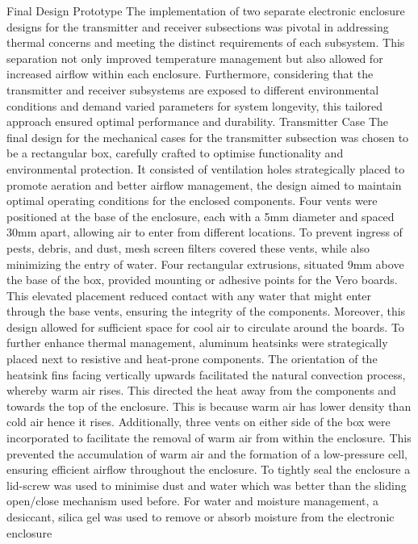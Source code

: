 Final Design Prototype
The implementation of two separate electronic enclosure designs for the transmitter and receiver subsections was pivotal in addressing thermal concerns and meeting the distinct requirements of each subsystem. This separation not only improved temperature management but also allowed for increased airflow within each enclosure. Furthermore, considering that the transmitter and receiver subsystems are exposed to different environmental conditions and demand varied parameters for system longevity, this tailored approach ensured optimal performance and durability.
Transmitter Case
The final design for the mechanical cases for the transmitter subsection was chosen to be a rectangular box, carefully crafted to optimise functionality and environmental protection. It consisted of ventilation holes strategically placed to promote aeration and better airflow management, the design aimed to maintain optimal operating conditions for the enclosed components. Four vents were positioned at the base of the enclosure, each with a 5mm diameter and spaced 30mm apart, allowing air to enter from different locations. To prevent ingress of pests, debris, and dust, mesh screen filters covered these vents, while also minimizing the entry of water.
Four rectangular extrusions, situated 9mm above the base of the box, provided mounting or adhesive points for the Vero boards. This elevated placement reduced contact with any water that might enter through the base vents, ensuring the integrity of the components. Moreover, this design allowed for sufficient space for cool air to circulate around the boards.
To further enhance thermal management, aluminum heatsinks were strategically placed next to resistive and heat-prone components. The orientation of the heatsink fins facing vertically upwards facilitated the natural convection process, whereby warm air rises. This directed the heat away from the components and towards the top of the enclosure. This is because warm air has lower density than cold air hence it rises. 
Additionally, three vents on either side of the box were incorporated to facilitate the removal of warm air from within the enclosure. This prevented the accumulation of warm air and the formation of a low-pressure cell, ensuring efficient airflow throughout the enclosure.
To tightly seal the enclosure a lid-screw was used to minimise dust and water which was better than the sliding open/close mechanism used before.
For water and moisture management, a desiccant, silica gel was used to remove or absorb moisture from the electronic enclosure

